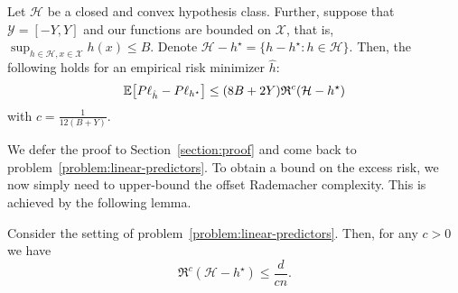 \documentclass[main.tex]{subfiles}
\begin{document}
\begin{theorem}
  \label{thm:main-result}
  Let $\mathcal{H}$ be a closed and convex hypothesis class.
  Further, suppose that $\mathcal{Y} = [-Y, Y]$ and our functions are bounded
  on $\mathcal{X}$, that is, $\sup_{h \in \mathcal{H}, x \in \mathcal{X}}
    h(x) \leq B$. Denote $\mathcal{H} - h^{\star} = \{
      h - h^{\star} : h \in \mathcal{H}\}$.
  Then, the following holds for an empirical risk minimizer
  $\hat{h}$:
  $$
    \mathbb{E}\!\left[{P\ell_{\hat{h}} - P\ell_{h^{\star}}}\right]
    \leq
    (8B + 2Y) \mathfrak{R}^{c}(\mathcal{H} - h^{\star})
  $$ with $c = \frac{1}{12(B + Y)}$.
\end{theorem}

We defer the proof to Section~\ref{section:proof} and come back to
problem~\ref{problem:linear-predictors}. To obtain a bound on the excess risk,
we now simply need to upper-bound the offset Rademacher complexity.
This is achieved by the following lemma.

\begin{lemma}
  \label{lemma:linear-predictors-offset-complexity}
  Consider the setting of problem~\ref{problem:linear-predictors}.
  Then, for any $c > 0$ we have
  $$
    \mathfrak{R}^{c}(\mathcal{H} - h^{\star})
    \leq \frac{d}{cn}.
  $$
\end{lemma}
\end{document}

